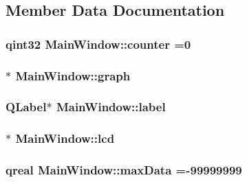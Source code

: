 \subsection{Member Data Documentation}
\hypertarget{class_main_window_a414ed704b853734bdbde7f0e8e333b20}{
\subsubsection[{counter}]{\setlength{\rightskip}{0pt plus 5cm}qint32 Main\-Window\-::counter =0\hspace{0.3cm}{\ttfamily [private]}}}\label{class_main_window_a414ed704b853734bdbde7f0e8e333b20}
\hypertarget{class_main_window_ac28b469bbf190a49e26ebfb3ff3c8d22}{
\subsubsection[{graph}]{$\ast$ Main\-Window\-::graph\hspace{0.3cm}{\ttfamily [private]}}}\label{class_main_window_ac28b469bbf190a49e26ebfb3ff3c8d22}
\hypertarget{class_main_window_a89e281849b9cf7d03662402c6bc6012c}{
\subsubsection[{label}]{\setlength{\rightskip}{0pt plus 5cm}Q\-Label$\ast$ Main\-Window\-::label\hspace{0.3cm}{\ttfamily [private]}}}\label{class_main_window_a89e281849b9cf7d03662402c6bc6012c}
\hypertarget{class_main_window_a62606e151c6477b9ed1287b792ef2643}{
\subsubsection[{lcd}]{$\ast$ Main\-Window\-::lcd\hspace{0.3cm}{\ttfamily [private]}}}\label{class_main_window_a62606e151c6477b9ed1287b792ef2643}
\hypertarget{class_main_window_a6e7a55c985b905d20ae02cfe0f64d2f2}{
\subsubsection[{max\-Data}]{\setlength{\rightskip}{0pt plus 5cm}qreal Main\-Window\-::max\-Data =-\/99999999\hspace{0.3cm}{\ttfamily [private]}}}\label{class_main_window_a6e7a55c985b905d20ae02cfe0f64d2f2}
